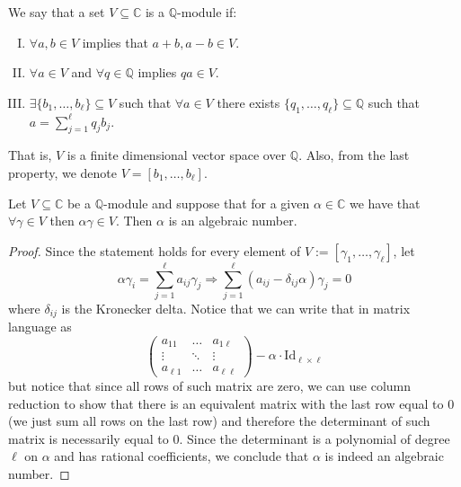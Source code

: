 \begin{definition}
    We say that a set \(V \subseteq \mathbb{C}\) is a \(\mathbb{Q}\)-module if:
    \begin{enumerate}[I.]
        \item  \(\forall a, b \in V\) implies that \(a + b, a - b \in V\).
        \item \(\forall a \in V\) and  \(\forall q \in \mathbb{Q}\) implies \(q a
              \in V\).
        \item \(\exists \{b_1, \dots, b_\ell\} \subseteq V\) such that \(\forall a
              \in V\) there exists \(\{q_1, \dots, q_\ell\} \subseteq \mathbb{Q}\)
              such that \(a = \sum_{j=1}^{\ell} q_j b_j\).
    \end{enumerate}
    That is, \(V\) is a finite dimensional vector space over \(\mathbb{Q}\). Also,
    from the last property, we denote \(V = [b_1, \dots, b_\ell]\).
\end{definition}

\begin{proposition}
    Let \(V \subseteq \mathbb{C}\) be a \(\mathbb{Q}\)-module and suppose that
    for a given \(\alpha \in \mathbb{C}\) we have that \(\forall \gamma \in V\)
    then \(\alpha \gamma \in V\). Then \(\alpha\) is an algebraic number.
\end{proposition}

\begin{proof}
    Since the statement holds for every element of \(V := [\gamma_1, \dots,
    \gamma_\ell]\), let
    \[
        \alpha\gamma_i = \sum_{j=1}^{\ell} a_{ij} \gamma_j
        \Rightarrow
        \sum_{j = 1}^\ell (a_{ij} - \delta_{ij}\alpha) \gamma_j = 0
    \]
    where \(\delta_{ij}\) is the Kronecker delta. Notice that we can write that
    in matrix language as
    \[
        \begin{pmatrix}
            a_{11}     & \dots  & a_{1\ell}     \\
            \vdots     & \ddots & \vdots        \\
            a_{\ell 1} & \dots  & a_{\ell \ell}
        \end{pmatrix}
        - \alpha \cdot \mathrm{Id}_{\ell \times \ell}
    \]
    but notice that since all rows of such matrix are zero, we can use  column
    reduction to show that there is an equivalent matrix with the last row equal
    to \(0\) (we just sum all rows on the last row) and therefore the determinant
    of such matrix is necessarily equal to \(0\). Since the determinant is a
    polynomial of degree \(\ell\) on \(\alpha\) and has rational coefficients, we
    conclude that \(\alpha\) is indeed an algebraic number.
\end{proof}

